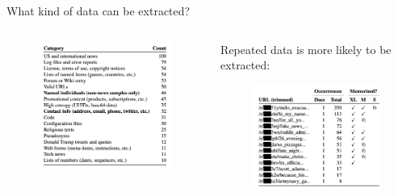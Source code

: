 \documentclass[usenames,dvipsnames,notes,11pt,aspectratio=169,hyperref={colorlinks=true, linkcolor=blue}]{beamer}
\begin{document}
\begin{frame}
    {What kind of data can be extracted?}
    \begin{columns}
        \begin{column}{0.5\textwidth}
            \begin{figure}
            \includegraphics[width=\textwidth]{figures/mem-data}
            \end{figure}
        \end{column}
        \begin{column}{0.5\textwidth}
            Repeated data is more likely to be extracted:
            \begin{figure}
            \includegraphics[width=\textwidth]{figures/mem-gpt2-string}
            \end{figure}
        \end{column}
        \end{columns}
\end{frame}
\end{document}

